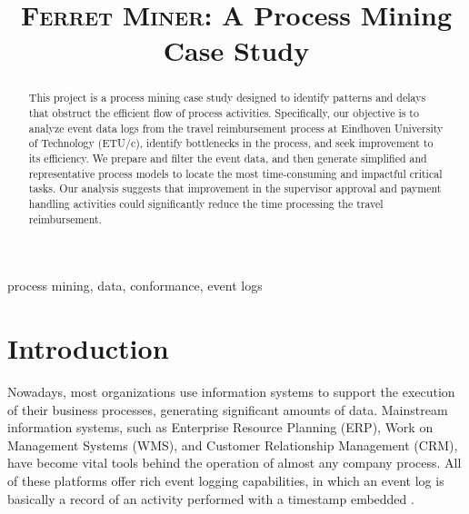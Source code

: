 \documentclass[conference]{IEEEtran}
\begin{document}
\title{\textsc{Ferret Miner}: A Process Mining Case Study}

\author{
\and
{}
\and
{}
\and
{}
}

\maketitle

\begin{abstract}
This project is a process mining case study designed to
identify patterns and
delays that obstruct the efficient flow of process
activities. Specifically, our
objective is to analyze event data logs from
the travel reimbursement process at Eindhoven University of Technology
(ETU/c), identify bottlenecks in the process, and
seek improvement to its efficiency.
We prepare and filter the event data, and then generate simplified and
representative process models to locate
the most time-consuming and impactful critical tasks.
Our analysis suggests that
improvement in the supervisor approval and payment handling activities 
could significantly
reduce the time processing the travel reimbursement.
\end{abstract}

\begin{IEEEkeywords}
process mining, data, conformance, event logs
\end{IEEEkeywords}

\section{Introduction}
\label{section-intro}


Nowadays, most organizations use information systems to support
the execution of their business processes, generating significant
amounts of data.
Mainstream information systems, such as Enterprise Resource
Planning (ERP), Work on Management Systems (WMS), and Customer
Relationship Management (CRM), have become vital tools behind the
operation of almost 
any company process\cite{Tuto2022}. All of these platforms
offer rich event logging capabilities, in which
an event log is
basically a record of an activity performed with a timestamp embedded
\cite{Proc2022}.
\end{document}
